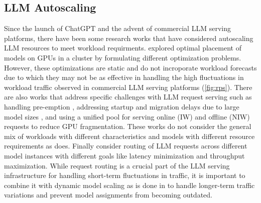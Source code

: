 \subsection{LLM Autoscaling} 

Since the launch of ChatGPT \cite{ChatGPT} and the advent of commercial LLM serving platforms, there have been some research works that have considered autoscaling LLM resources to meet workload requirments. \cite{li2023alpaserve,melange,mei2024helix} explored optimal placement of models on GPUs in a cluster by formulating different optimization problems. However, these optimizations are static and do not incroporate workload forecasts due to which they may not be as effective in handling the high fluctuations in workload traffic observed in commercial LLM serving platforms (\autoref{fig:rps}). There are also works that address specific challenges with LLM request serving such as handling pre-emption \cite{miao2024spotserve}, addressing startup and migration delays due to large model sizes \cite{fu2024serverlessllm}, and using a unified pool for serving online (IW) and offline (NIW) requests to reduce GPU fragmentation\cite{qiao2024conserve}. These works do not consider the general mix of workloads with different characteristics and models with different resource requirements as \sys does. Finally \cite{wu2023fast,nie2024aladdin,jain2024intelligent,kossmann2024gpu} consider routing of LLM requests across different model instances with different goals like latency minimization and throughput maximization. While request routing is a crucial part of the LLM serving infrastructure for handling short-term fluctuations in traffic, it is important to combine it with dynamic model scaling as is done in \sys to handle longer-term traffic variations and prevent model assignments from becoming outdated. 


